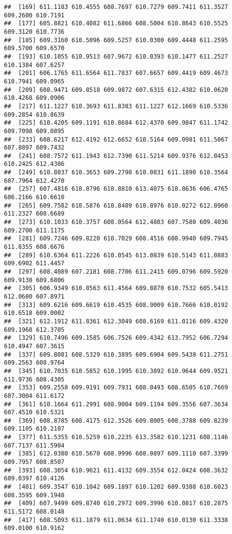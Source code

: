 \documentclass[
]{article}
\begin{document}
\begin{verbatim}
##  [169] 611.1183 610.4555 608.7697 610.7279 609.7411 611.3527 609.2600 610.7191
##  [177] 605.8821 610.4082 611.6866 608.5004 610.8643 610.5525 609.3120 610.7736
##  [185] 609.3160 610.5096 609.5257 610.0300 609.4448 611.2595 609.5700 609.6570
##  [193] 610.1055 610.9513 607.9672 610.0393 610.1477 611.2527 610.1384 607.6257
##  [201] 606.1765 611.6564 611.7837 607.6657 609.4419 609.4673 610.7941 609.0965
##  [209] 608.9471 609.8518 609.9872 607.6315 612.4382 610.0620 610.4268 609.0906
##  [217] 611.1227 610.3693 611.8383 611.1227 612.1669 610.5336 609.2854 610.8639
##  [225] 610.4205 609.1191 610.8684 612.4370 609.9847 611.1742 609.7098 609.0895
##  [233] 608.6217 612.4192 612.6652 610.5164 609.0981 611.5067 607.8897 609.7432
##  [241] 608.7572 611.1943 612.7390 611.5214 609.9376 612.0453 610.2425 612.4386
##  [249] 610.8037 610.3653 609.2798 610.0831 611.1890 610.3564 607.7964 612.4270
##  [257] 607.4816 610.8796 610.8810 613.4075 610.8636 606.4765 606.2166 610.6610
##  [265] 609.7582 610.5876 610.8489 610.8976 610.0272 612.0960 611.2327 608.6689
##  [273] 610.1033 610.3757 608.0564 612.4803 607.7580 609.4036 609.2700 611.1175
##  [281] 609.7246 609.8220 610.7029 608.4516 608.9940 609.7945 611.8355 608.6676
##  [289] 610.6364 611.2226 610.0545 613.0839 610.5143 611.0883 609.6902 611.4457
##  [297] 608.4089 607.2181 608.7706 611.2415 609.0796 609.5920 609.9138 609.6806
##  [305] 606.9349 610.8563 611.4564 609.8870 610.7532 605.5413 612.0680 607.8971
##  [313] 609.6216 609.6619 610.4535 608.9009 610.7666 610.0192 610.6518 609.0002
##  [321] 612.1912 611.8361 612.3049 608.6169 611.0116 609.4320 609.1968 612.3705
##  [329] 610.7496 609.1585 606.7526 609.4342 613.7952 606.7294 610.4947 607.3615
##  [337] 609.8081 608.5329 610.3895 609.6904 609.5438 611.2751 609.2563 608.9764
##  [345] 610.7035 610.5852 610.1995 610.3892 610.9644 609.9521 611.9736 608.4305
##  [353] 609.2558 609.9191 609.7931 608.0493 608.6505 610.7669 607.3004 611.6172
##  [361] 610.1664 611.2991 608.9004 609.1194 609.3556 607.3634 607.4510 610.5321
##  [369] 608.8785 608.4175 612.3526 609.8005 608.3788 609.8239 609.1105 610.2107
##  [377] 611.5355 610.5259 610.2235 613.3582 610.1231 608.1146 607.7137 611.5904
##  [385] 612.0380 610.5670 608.9996 608.0897 609.1110 607.3399 609.7957 608.8507
##  [393] 608.3054 610.9621 611.4132 609.3554 612.0424 608.3632 609.0397 610.4126
##  [401] 609.3547 610.1042 609.1897 610.1202 609.9388 610.6023 608.3595 609.1948
##  [409] 607.9499 609.8740 610.2972 609.3996 610.0817 610.2875 611.5172 608.0148
##  [417] 608.5093 611.1879 611.0634 611.1740 610.0130 611.3338 609.0100 610.9162

\end{verbatim}
\end{document}
